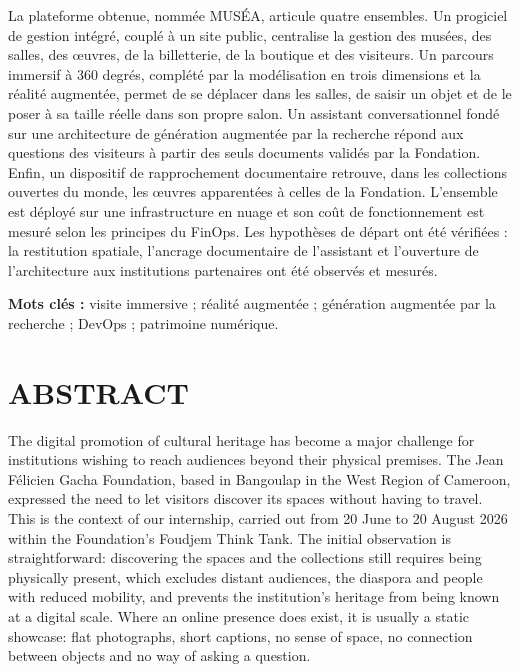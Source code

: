 La plateforme obtenue, nommée MUSÉA, articule quatre ensembles. Un progiciel de
gestion intégré, couplé à un site public, centralise la gestion des musées, des
salles, des œuvres, de la billetterie, de la boutique et des visiteurs. Un
parcours immersif à 360 degrés, complété par la modélisation en trois dimensions
et la réalité augmentée, permet de se déplacer dans les salles, de saisir un
objet et de le poser à sa taille réelle dans son propre salon. Un assistant
conversationnel fondé sur une architecture de génération augmentée par la
recherche répond aux questions des visiteurs à partir des seuls documents
validés par la Fondation. Enfin, un dispositif de rapprochement documentaire
retrouve, dans les collections ouvertes du monde, les œuvres apparentées à
celles de la Fondation. L'ensemble est déployé sur une infrastructure en nuage
et son coût de fonctionnement est mesuré selon les principes du FinOps. Les
hypothèses de départ ont été vérifiées : la restitution spatiale, l'ancrage
documentaire de l'assistant et l'ouverture de l'architecture aux institutions
partenaires ont été observés et mesurés.

\endgroup

\vspace{0.6cm}
\noindent\textbf{Mots clés :} visite immersive ; réalité augmentée ;
génération augmentée par la recherche ; DevOps ; patrimoine numérique.

\cleardoublepage
{}
\chapter*{ABSTRACT}

\begingroup
{}

The digital promotion of cultural heritage has become a major challenge for
institutions wishing to reach audiences beyond their physical premises. The Jean
Félicien Gacha Foundation, based in Bangoulap in the West Region of Cameroon,
expressed the need to let visitors discover its spaces without having to travel.
This is the context of our internship, carried out from 20 June to 20 August
2026 within the Foundation's Foudjem Think Tank. The initial observation is
straightforward: discovering the spaces and the collections still requires being
physically present, which excludes distant audiences, the diaspora and people
with reduced mobility, and prevents the institution's heritage from being known
at a digital scale. Where an online presence does exist, it is usually a static
showcase: flat photographs, short captions, no sense of space, no connection
between objects and no way of asking a question.

